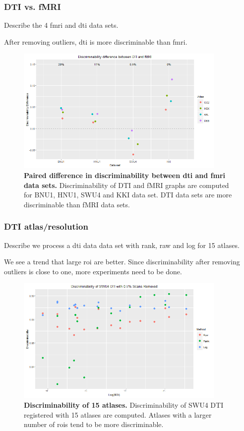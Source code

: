 \documentclass{article}
\begin{document}
\subsubsection{DTI vs. fMRI}
 Describe the 4 fmri and dti data sets.

 After removing outliers, dti is more discriminable than fmri.

\begin{figure}[ht!]
	\includegraphics[width=4.0in]{../Figs/dti_mri_differ.png}
	\caption{{ \bf Paired difference in discriminability between dti and fmri data sets.} Discriminability of DTI and fMRI graphs are computed for BNU1, HNU1, SWU4 and KKI data set. DTI data sets are more discriminable than fMRI data sets.}
	\label{fig:7}
\end{figure}

\subsubsection{DTI atlas/resolution}
 Describe we process a  dti data data set with rank, raw and log for 15 atlases. 

 We see a trend that large roi are better. Since discriminability after removing outliers is close to one, more experiments need to be done.

\begin{figure}[ht!]
	\includegraphics[width=4.0in]{../Figs/SWU4_DTI_logroi.png}
	\caption{{ \bf Discriminability of 15 atlases.} Discriminability of SWU4 DTI registered with 15 atlases are computed. Atlases with a larger number of rois tend to be more discriminable.}
	\label{fig:7}
\end{figure}
\end{document}
